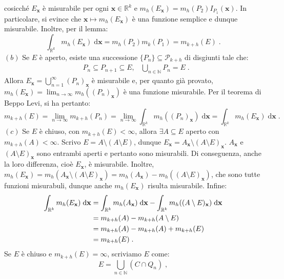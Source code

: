 \documentclass[a4paper,12pt]{report}
\theoremstyle{plain}
\theoremstyle{definition}
\theoremstyle{remark}
\newcommand{\diff}[1]{\mathrm{d}#1}
\numberwithin{equation}{section}
\begin{document}
cosicché $E_{\mathbf{x}}$ è misurabile per ogni $\mathbf{x}\in\mathbb{R}^k$ e $m_h(E_{\mathbf{x}})=m_h(P_2)I_{P_1}(\mathbf{x})$. In 
particolare, si evince che $\mathbf{x}\longmapsto m_h(E_{\mathbf{x}})$ è una funzione semplice e dunque misurabile. Inoltre, per il lemma:
\begin{equation}
\int_{\mathbb{R}^k} m_h(E_{\mathbf{x}})\;\diff{\mathbf{x}}=m_h(P_2)m_k(P_1)=m_{k+h}(E)\;.
\end{equation}
$(b)$ Se $E$ è aperto, esiste una successione $\{P_n\}\subseteq \mathcal{P}_{k+h}$ di disgiunti tale che:
\begin{align}
&P_n\subseteq P_{n+1}\subseteq E, &\bigcup_{n\in\mathbb{N}} P_n=E\;.
\end{align}
Allora $E_{\mathbf{x}}=\bigcup_{n=1}^{\infty}(P_n)_{\mathbf{x}}$ è misurabile e, per quanto già provato, $m_h(E_{\mathbf{x}})=\lim_{n\to
\infty} m_h((P_n)_{\mathbf{x}})$ è una funzione misurabile. Per il teorema di Beppo Levi, si ha pertanto:
\begin{equation}
m_{k+h}(E)=\lim_{n\to\infty}m_{k+h}(P_n)=\lim_{n\to\infty}\int_{\mathbb{R}^k} m_h((P_n)_{\mathbf{x}})\;\diff{\mathbf{x}}=\int_{\mathbb{R}^k}m_h(E_{\mathbf{x}})\;\diff{\mathbf{x}}\;.
\end{equation}
$(c)$ Se $E$ è chiuso, con $m_{k+h}(E)<\infty$, allora $\exists A\subseteq E$ aperto con $m_{k+h}(A)<\infty$. Scrivo $E=A\setminus(A
\setminus E)$, dunque $E_{\mathbf{x}}=A_{\mathbf{x}}\setminus(A\setminus E)_{\mathbf{x}}$. $A_{\mathbf{x}}$ e $(A\setminus E)_{\mathbf{x}
}$ sono entrambi aperti e pertanto sono misurabili. Di conseguenza, anche la loro differenza, cioè $E_{\mathbf{x}}$, è misurabile. 
Inoltre, $m_{h}(E_{\mathbf{x}})=m_h(A_{\mathbf{x}}\setminus(A\setminus E)_{\mathbf{x}})=m_h(A_{\mathbf{x}})-m_h((A\setminus E)_{\mathbf{x}})$, che sono tutte funzioni misurabuli, dunque anche $m_h(E_{\mathbf{x}})$ risulta misurabile. Infine:
\begin{align}
\int_{\mathbb{R}^k} m_h(E_{\mathbf{x}})\;\diff{\mathbf{x}} &=\int_{\mathbb{R}^k}m_h(A_{\mathbf{x}})\;\diff{\mathbf{x}}-\int_{\mathbb{R}^k}m_h((A\setminus E)_{\mathbf{x}})\;\diff{\mathbf{x}} \notag \\
&=m_{k+h}(A)-m_{k+h}(A\setminus E) \notag \\
&= m_{k+h}(A)-m_{k+h}(A)+m_{k+h}(E) \notag \\
&= m_{k+h}(E)\;.
\end{align}
Se $E$ è chiuso e $m_{k+h}(E)=\infty$, scriviamo $E$ come:
\begin{equation}
E=\bigcup_{n\in\mathbb{N}}(C\cap Q_n)\;,
\end{equation}
\end{document}
